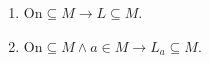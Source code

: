 \begin{enumerate}
\item $\mathrm{On} \subseteq M \rightarrow L \subseteq M$.
\item $\mathrm{On} \subseteq M \land a \in M \rightarrow L_a \subseteq M$.
\end{enumerate}
